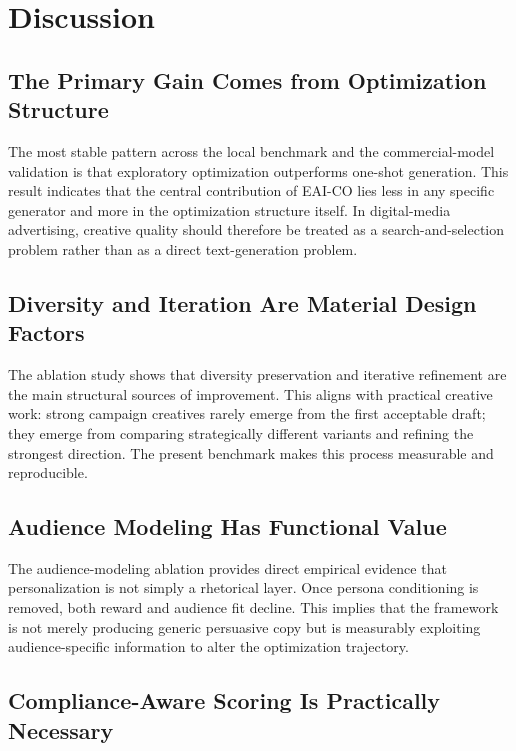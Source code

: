 \documentclass[applsci,article,submit,pdftex,moreauthors]{Definitions/mdpi}
\begin{document}
\section{Discussion}

\subsection{The Primary Gain Comes from Optimization Structure}

The most stable pattern across the local benchmark and the commercial-model validation is that exploratory optimization outperforms one-shot generation. This result indicates that the central contribution of EAI-CO lies less in any specific generator and more in the optimization structure itself. In digital-media advertising, creative quality should therefore be treated as a search-and-selection problem rather than as a direct text-generation problem.

\subsection{Diversity and Iteration Are Material Design Factors}

The ablation study shows that diversity preservation and iterative refinement are the main structural sources of improvement. This aligns with practical creative work: strong campaign creatives rarely emerge from the first acceptable draft; they emerge from comparing strategically different variants and refining the strongest direction. The present benchmark makes this process measurable and reproducible.

\subsection{Audience Modeling Has Functional Value}

The audience-modeling ablation provides direct empirical evidence that personalization is not simply a rhetorical layer. Once persona conditioning is removed, both reward and audience fit decline. This implies that the framework is not merely producing generic persuasive copy but is measurably exploiting audience-specific information to alter the optimization trajectory.

\subsection{Compliance-Aware Scoring Is Practically Necessary}
\end{document}

